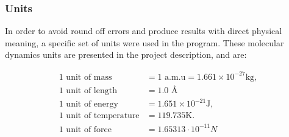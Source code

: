\subsubsection{Units} \label{sec:units}

In order to avoid round off errors and produce results with direct physical meaning, a specific set of units were used in the program. These molecular dynamics units are presented in the project description, and are:

\begin{align}
\text{1 unit of mass } &= 1 \text{ a.m.u} = 1.661\times 10^{-27}\mathrm{kg},\\
\text{1 unit of length } &= 1.0 \text{ \AA} \\
\text{1 unit of energy } &= 1.651\times 10^{-21}\mathrm{J},\\
\text{1 unit of temperature} &= 119.735\mathrm{K}.\\
\text{1 unit of force}  &= 1.65313\cdot10^{-11} N \\
\end{align}






